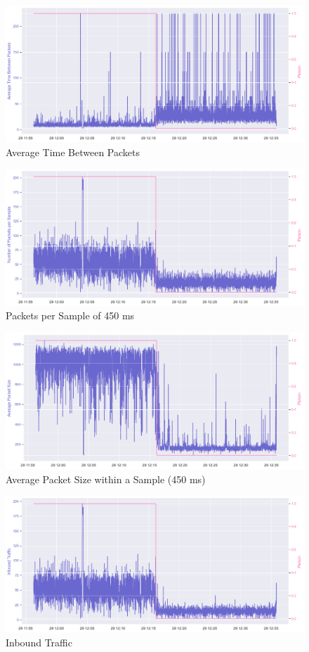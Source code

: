 \documentclass{article}
\begin{document}
\begin{figure}[h!]
	\centering
	\includegraphics[width=12cm]{assets/avg-inter-time.png}
	\caption{Average Time Between Packets}
	\label{fig::avg-inter-time}
\end{figure}

\begin{figure}[h!]
	\centering
	\includegraphics[width=12cm]{assets/packets-per-sample.png}
	\caption{Packets per Sample of 450 ms}
	\label{fig::pkt-per-sample}
\end{figure}

\begin{figure}[h!]
	\centering
	\includegraphics[width=12cm]{assets/avg-pkt-size.png}
	\caption{Average Packet Size within a Sample (450 ms)}
	\label{fig::avg-pkt-size}
\end{figure}

\begin{figure}[h!]
	\centering
	\includegraphics[width=12cm]{assets/inbound-traffic.png}
	\caption{Inbound Traffic}
	\label{fig::inbound-traffic}
\end{figure}
\end{document}
